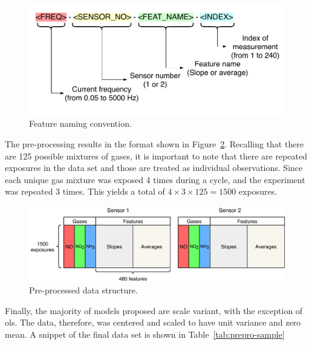 \begin{figure}[h]
	\centering
	\includegraphics[width=1\textwidth]{../figures/feat-naming.pdf}
	\caption{Feature naming convention.}
	\label{fig:feat-naming}
\end{figure}

The pre-processing results in the format shown in Figure~\ref{fig:preprocessed-data}. Recalling that there are 125 possible mixtures of gases, it is important to note that there are repeated exposures in the data set and those are treated as individual observations. Since each unique gas mixture was exposed 4 times during a cycle, and the experiment was repeated 3 times. This yields a total of $4 \times 3 \times 125 = 1500$ exposures.

\begin{figure}[h]
	\centering
	\includegraphics[width=1\textwidth]{../figures/preprocessed-data.pdf}
	\caption{Pre-processed data structure.}
	\label{fig:preprocessed-data}
\end{figure}

Finally, the majority of models proposed are scale variant, with the exception of \acrshort{ols}. The data, therefore, was centered and scaled to have unit variance and zero mean. A snippet of the final data set is shown in Table~\ref{tab:prepro-sample}


